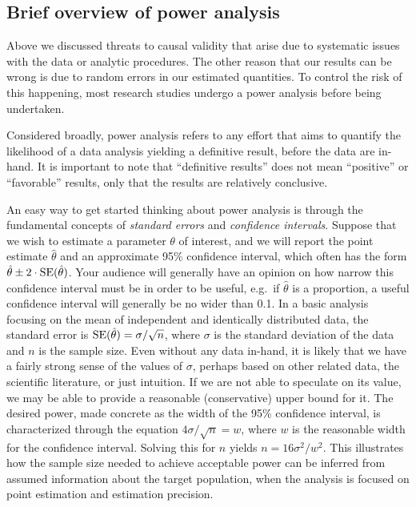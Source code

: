 \subsection{Brief overview of power analysis \label{power}}

Above we discussed threats to causal validity that arise due to systematic issues with the data or analytic procedures.  The other reason that our results can be wrong is due to random errors in our estimated quantities.  To control the risk of this happening, most research studies undergo a power analysis before being undertaken.

Considered broadly, power analysis refers to any effort that aims to quantify the likelihood of a data analysis yielding a definitive result, before the data are in-hand.  It is important to note that ``definitive results'' does not mean ``positive'' or ``favorable'' results, only that the results are relatively conclusive.

An easy way to get started thinking about power analysis is through the fundamental concepts of {\em standard errors} and {\em confidence intervals}.  Suppose that we wish to estimate a parameter $\theta$ of interest, and we will report the point estimate $\hat{\theta}$ and an approximate 95\% confidence interval, which often has the form $\hat{\theta} \pm 2\cdot{\rm SE}(\hat{\theta})$.  Your audience will generally have an opinion on how narrow this confidence interval must be in order to be useful, e.g.\ if $\hat{\theta}$ is a proportion, a useful confidence interval will generally be no wider than 0.1.  In a basic analysis focusing on the mean of independent and identically distributed data, the standard error is ${\rm SE}(\hat{\theta}) = \sigma / \sqrt{n}$, where $\sigma$ is the standard deviation of the data and $n$ is the sample size.  Even without any data in-hand, it is likely that we have a fairly strong sense of the values of $\sigma$, perhaps based on other related data, the scientific literature, or just intuition.  If we are not able to speculate on its value, we may be able to provide a reasonable (conservative) upper bound for it.  The desired power, made concrete as the width of the 95\% confidence interval, is characterized through the equation $4\sigma / \sqrt{n} = w$, where $w$ is the reasonable width for the confidence interval.  Solving this for $n$ yields $n = 16\sigma^2 / w^2$.  This illustrates how the sample size needed to achieve acceptable power can be inferred from assumed information about the target population, when the analysis is focused on point estimation and estimation precision.

